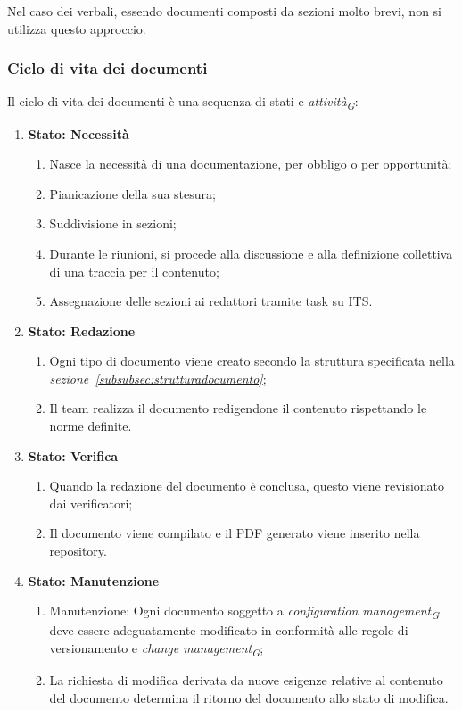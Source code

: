 Nel caso dei verbali, essendo documenti composti da sezioni molto brevi, non si utilizza questo approccio.

\subsubsection{Ciclo di vita dei documenti}
Il ciclo di vita dei documenti è una sequenza di stati e \textit{attività}\textsubscript{\textit{G}}:
\begin{enumerate}
    \item \textbf{Stato: Necessità}
          \begin{enumerate}
              \item Nasce la necessità di una documentazione, per obbligo o per opportunità;
              \item Pianicazione della sua stesura;
              \item Suddivisione in sezioni;
              \item Durante le riunioni, si procede alla discussione e alla definizione collettiva di una traccia per il contenuto;
              \item Assegnazione delle sezioni ai redattori tramite task su ITS. 
          \end{enumerate}
    \item \textbf{Stato: Redazione}
          \begin{enumerate}
              \item  Ogni tipo di documento viene creato secondo la struttura specificata nella \textit{sezione~\ref{subsubsec:strutturadocumento}};
              \item Il team realizza il documento redigendone il contenuto rispettando le norme definite.
          \end{enumerate}
    \item \textbf{Stato: Verifica}
          \begin{enumerate}
              \item Quando la redazione del documento è conclusa, questo viene revisionato dai verificatori;
              \item Il documento viene compilato e il PDF generato viene inserito nella repository.
          \end{enumerate}
    \item \textbf{Stato: Manutenzione}
          \begin{enumerate}
              \item Manutenzione: Ogni documento soggetto a \textit{configuration management}\textsubscript{\textit{G}} deve essere adeguatamente modificato in conformità alle regole di versionamento e \textit{change management}\textsubscript{\textit{G}};
              \item La richiesta di modifica derivata da nuove esigenze relative al contenuto del documento determina il ritorno del documento allo stato di modifica.
          \end{enumerate}
\end{enumerate}

